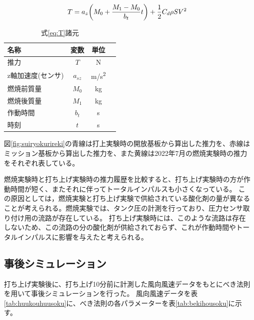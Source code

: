 \documentclass[a4paper,11pt,uplatex]{jsarticle}
\begin{document}
\begin{equation}
	T = a_z\qty(M_0 + \frac{M_1-M_0}{b_t}t)+\frac{1}{2}C_d \rho S V^2
	\label{eq:T}
\end{equation}

\begin{table}[H]
	\centering
	\caption{式\eqref{eq:T}諸元}
	\label{tab:eqshogen}
	\begin{tabular}{lccr}
		\toprule
		名称         & 変数       & 単位         \\
		\midrule
		推力         & $T$      & \si{N}     \\
		z軸加速度(センサ) & $a_{sz}$ & \si{m/s^2} \\
		燃焼前質量      & $M_0$    & \si{kg}    \\
		燃焼後質量      & $M_1$    & \si{kg}    \\
		作動時間       & $b_t$    & \si{s}     \\
		時刻         & $t$      & \si{s}     \\
		\bottomrule
	\end{tabular}
\end{table}

図\ref{fig:suiryokurireki}の青線は打上実験時の開放基板から算出した推力を、赤線はミッション基板から算出した推力を、また黄線は2022年7月の燃焼実験時の推力をそれぞれ表している。

燃焼実験時と打ち上げ実験時の推力履歴を比較すると、打ち上げ実験時の方が作動時間が短く、またそれに伴ってトータルインパルスも小さくなっている。
この原因としては，燃焼実験と打ち上げ実験で供給されている酸化剤の量が異なることが考えられる。燃焼実験では、タンク圧の計測を行っており、圧力センサ取り付け用の流路が存在している。
打ち上げ実験時には、このような流路は存在しないため、この流路の分の酸化剤が供給されておらず、これが作動時間やトータルインパルスに影響を与えたと考えられる。

\subsection{事後シミュレーション}
打ち上げ実験後に、打ち上げ10分前に計測した風向風速データをもとにべき法則を用いて事後シミュレーションを行った。
風向風速データを表\ref{tab:huukouhuusoku}に、べき法則の各パラメーターを表\ref{tab:bekihousoku}に示す。
\end{document}
